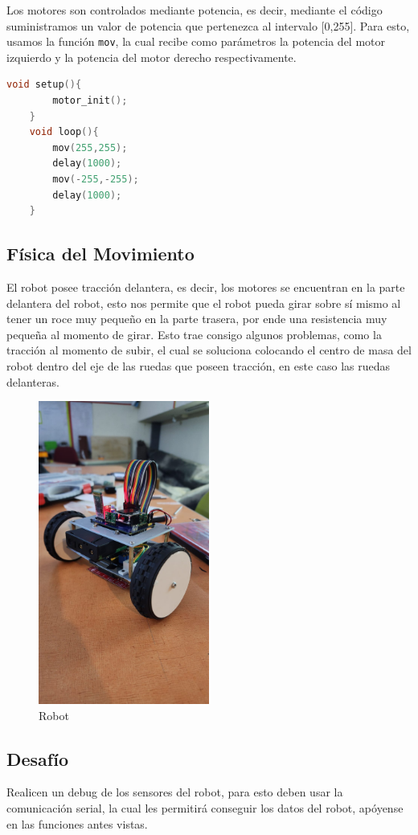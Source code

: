 \documentclass[12pt]{article}
\begin{document}
Los motores son controlados mediante potencia, es decir, mediante el código suministramos un valor de potencia que pertenezca al intervalo [0,255]. Para
esto, usamos la función \texttt{mov}, la cual recibe como parámetros la potencia del motor izquierdo y la potencia del motor derecho respectivamente.

\begin{lstlisting}[language=C++, basicstyle=\color{codecolor}]
    void setup(){
        motor_init();
    }
    void loop(){
        mov(255,255);
        delay(1000);
        mov(-255,-255);
        delay(1000);
    }
\end{lstlisting}

\subsection*{\textcolor{subtitlecolor}{Física del Movimiento}}
El robot posee tracción delantera, es decir, los motores se encuentran en la parte delantera del robot, esto nos permite que el robot pueda girar sobre sí mismo
al tener un roce muy pequeño en la parte trasera, por ende una resistencia muy pequeña al momento de girar.
Esto trae consigo algunos problemas, como la tracción al momento de subir, el cual se soluciona colocando el centro de masa del robot dentro del eje de las
ruedas que poseen tracción, en este caso las ruedas delanteras.

\begin{figure}[H]
    \centering
    \includegraphics[width=0.5\textwidth]{robot_images/robot1.jpeg}
    \caption{Robot}
    \label{fig:robot}
\end{figure}

\subsection*{\textcolor{subtitlecolor}{Desafío}}
Realicen un debug de los sensores del robot, para esto deben usar la comunicación serial, la cual les permitirá
conseguir los datos del robot, apóyense en las funciones antes vistas.
\end{document}
